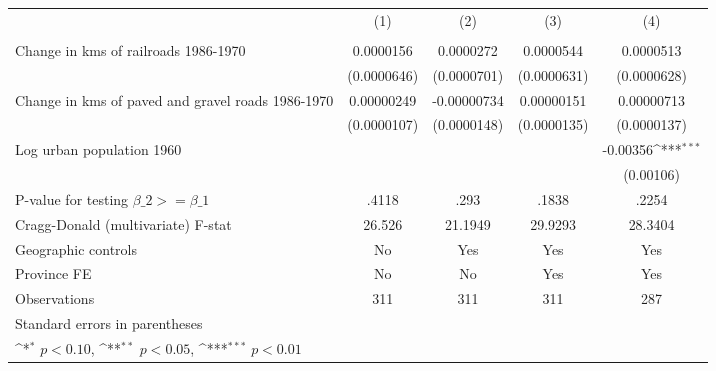 {
\def\sym#1{\ifmmode^{#1}\else\(^{#1}\)\fi}
\begin{tabular}{l*{4}{c}}
\hline\hline
                &\multicolumn{1}{c}{(1)}&\multicolumn{1}{c}{(2)}&\multicolumn{1}{c}{(3)}&\multicolumn{1}{c}{(4)}\\
                &\multicolumn{1}{c}{}&\multicolumn{1}{c}{}&\multicolumn{1}{c}{}&\multicolumn{1}{c}{}\\
\hline
Change in kms of railroads 1986-1970&0.0000156         &0.0000272         &0.0000544         &0.0000513         \\
                &(0.0000646)         &(0.0000701)         &(0.0000631)         &(0.0000628)         \\
[1em]
Change in kms of paved and gravel roads 1986-1970&0.00000249         &-0.00000734         &0.00000151         &0.00000713         \\
                &(0.0000107)         &(0.0000148)         &(0.0000135)         &(0.0000137)         \\
[1em]
Log urban population 1960&                  &                  &                  & -0.00356\sym{***}\\
                &                  &                  &                  &(0.00106)         \\
\hline
P-value for testing $\beta\_{2} >= \beta\_{1}$&    .4118         &     .293         &    .1838         &    .2254         \\
Cragg-Donald (multivariate) F-stat&   26.526         &  21.1949         &  29.9293         &  28.3404         \\
Geographic controls&       No         &      Yes         &      Yes         &      Yes         \\
Province FE     &       No         &       No         &      Yes         &      Yes         \\
Observations    &      311         &      311         &      311         &      287         \\
\hline\hline
\multicolumn{5}{l}{\footnotesize Standard errors in parentheses}\\
\multicolumn{5}{l}{\footnotesize \sym{*} \(p<0.10\), \sym{**} \(p<0.05\), \sym{***} \(p<0.01\)}\\
\end{tabular}
}
